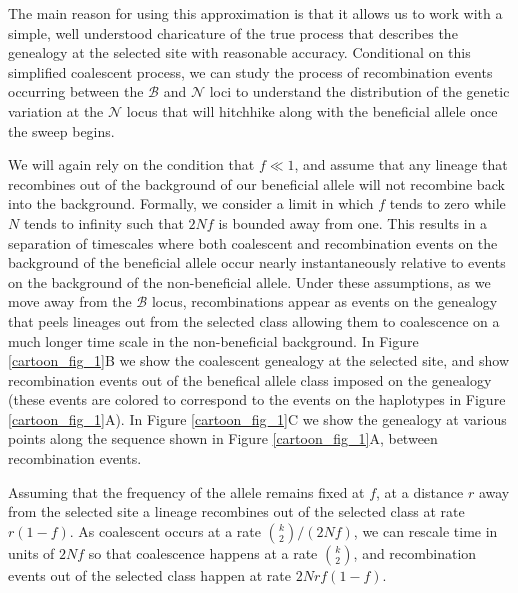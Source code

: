 \documentclass[a4paper,10pt]{article}
\newcommand{\fancyN}{$\mathcal N$ }
\newcommand{\fancyB}{$\mathcal B$ }
\begin{document}
The main reason for using this approximation is that it allows us to work with a simple, well understood charicature of the true process that describes the genealogy at the selected site with reasonable accuracy. Conditional on this simplified coalescent process, we can study the process of recombination events occurring between the \fancyB and \fancyN loci to understand the distribution of the genetic variation at the \fancyN locus that will hitchhike along with the beneficial allele once the sweep begins. 

We will again rely on the condition that $f \ll 1$, and assume that any lineage that recombines out of the background of our beneficial allele will not recombine back into the background. Formally, we consider a limit in which $f$ tends to zero while $N$ tends to infinity such that $2Nf$ is bounded away from one. This results in a separation of timescales where both coalescent and recombination events on the background of the beneficial allele occur nearly instantaneously relative to events on the background of the non-beneficial allele. Under these assumptions, as we move away from the \fancyB locus, recombinations appear as events on the genealogy that peels lineages out from the selected class allowing them to coalescence on a much longer time scale in the non-beneficial background. In Figure \ref{cartoon_fig_1}B we show the coalescent genealogy at the selected site, and show recombination events out of the benefical allele class imposed on the genealogy (these events are colored to correspond to the events on the haplotypes in Figure \ref{cartoon_fig_1}A). In 
Figure \ref{cartoon_fig_1}C we show the genealogy at various points along the sequence shown in Figure \ref{cartoon_fig_1}A, between recombination events. 

Assuming that the frequency of the allele remains fixed at $f$, at a distance $r$ away from the selected site a lineage recombines out of the selected class at rate $r(1-f)$. As coalescent occurs at a rate ${k \choose 2}/(2Nf)$, we can rescale time in units of $2Nf$ so that coalescence happens at a rate ${k \choose 2}$, and recombination events out of the selected class happen at rate $2Nrf(1-f)$. 
\end{document}
